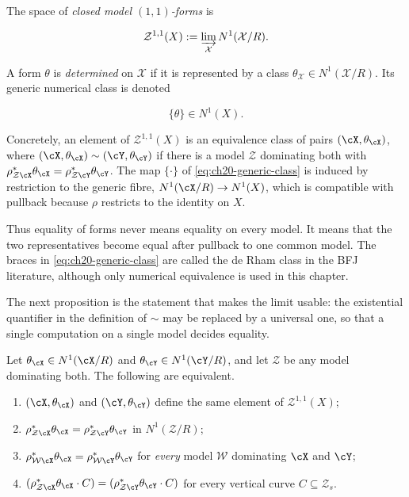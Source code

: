 \begin{definition}
\label{def:ch20-closed-model-form}
The space of \emph{closed model $(1,1)$-forms} is

\begin{equation}
\label{eq:ch20-model-forms}
 \mathcal Z^{1,1}(X)
   :=\varinjlim_{\mathcal X}N^1(\mathcal X/R).
\end{equation}

A form $\theta$ is \emph{determined} on $\mathcal X$ if it is represented
by a class $\theta_{\mathcal X}\in N^1(\mathcal X/R)$.  Its generic
numerical class is denoted

\begin{equation}
\label{eq:ch20-generic-class}
                 \{\theta\}\in N^1(X).
\end{equation}
\end{definition}

Concretely, an element of $\mathcal Z^{1,1}(X)$ is an equivalence class of pairs
$(\cX,\theta_{\cX})$, where $(\cX,\theta_{\cX})\sim(\cY,\theta_{\cY})$
if there is a model $\mathcal Z$ dominating both with
$\rho_{\mathcal Z\cX}^*\theta_{\cX}=\rho_{\mathcal Z\cY}^*\theta_{\cY}$.  The map
$\{\cdot\}$ of \eqref{eq:ch20-generic-class} is induced by restriction to
the generic fibre, $N^1(\cX/R)\to N^1(X)$, which is compatible with
pullback because $\rho$ restricts to the identity on $X$.

Thus equality of forms never means equality on every model.  It means that
the two representatives become equal after pullback to one common model.
The braces in \eqref{eq:ch20-generic-class} are called the de Rham class in
the BFJ literature, although only numerical equivalence is used in this
chapter.

The next proposition is the statement that makes the limit usable: the
existential quantifier in the definition of $\sim$ may be replaced by a
universal one, so that a single computation on a single model decides
equality.

\begin{proposition}
\label{prop:ch20-two-model-comparison}
Let $\theta_{\cX}\in N^1(\cX/R)$ and $\theta_{\cY}\in N^1(\cY/R)$, and
let $\mathcal Z$ be any model dominating both.  The following are equivalent.
\begin{enumerate}
\item\label{itm:ch20-tmc:some} $(\cX,\theta_{\cX})$ and
 $(\cY,\theta_{\cY})$ define the same element of $\mathcal Z^{1,1}(X)$;
\item\label{itm:ch20-tmc:this}
 $\rho_{\mathcal Z\cX}^*\theta_{\cX}=\rho_{\mathcal Z\cY}^*\theta_{\cY}$ in
 $N^1(\mathcal Z/R)$;
\item\label{itm:ch20-tmc:all}
 $\rho_{\mathcal W\cX}^*\theta_{\cX}=\rho_{\mathcal W\cY}^*\theta_{\cY}$ for
 \emph{every} model $\mathcal W$ dominating $\cX$ and $\cY$;
\item\label{itm:ch20-tmc:curves}
 $(\rho_{\mathcal Z\cX}^*\theta_{\cX}\cdot C)
   =(\rho_{\mathcal Z\cY}^*\theta_{\cY}\cdot C)$ for every vertical curve
 $C\subseteq\mathcal Z_s$.
\end{enumerate}
\end{proposition}

